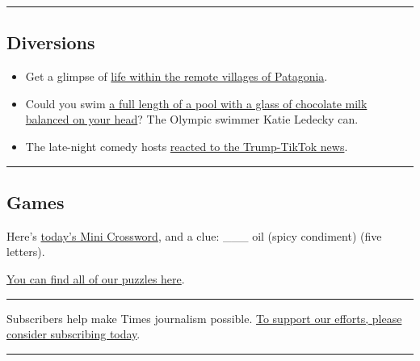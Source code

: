\begin{center}\rule{0.5\linewidth}{\linethickness}\end{center}

\hypertarget{diversions}{%
\subsection{Diversions}\label{diversions}}

\begin{itemize}
\item
  Get a glimpse of
  \href{https://www.nytimes3xbfgragh.onion/2020/08/03/travel/remote-schools-patagonia.html}{life
  within the remote villages of Patagonia}.
\item
  Could you swim
  \href{https://twitter.com/Peter_Baugh/status/1290335655051104257}{a
  full length of a pool with a glass of chocolate milk balanced on your
  head}? The Olympic swimmer Katie Ledecky can.
\item
  The late-night comedy hosts
  \href{https://www.nytimes3xbfgragh.onion/2020/08/04/arts/television/seth-meyers-tiktok-trump.html}{reacted
  to the Trump-TikTok news}.
\end{itemize}

\begin{center}\rule{0.5\linewidth}{\linethickness}\end{center}

\hypertarget{games}{%
\subsection{Games}\label{games}}

Here's
\href{https://www.nytimes3xbfgragh.onion/crosswords/game/mini}{today's
Mini Crossword}, and a clue: \_\_\_ oil (spicy condiment) (five
letters).

\href{https://www.nytimes3xbfgragh.onion/crosswords}{You can find all of
our puzzles here}.

\begin{center}\rule{0.5\linewidth}{\linethickness}\end{center}

Subscribers help make Times journalism possible.
\href{https://www.nytimes3xbfgragh.onion/subscription?campaignId=98XRW}{To
support our efforts, please consider subscribing today}.

\begin{center}\rule{0.5\linewidth}{\linethickness}\end{center}

